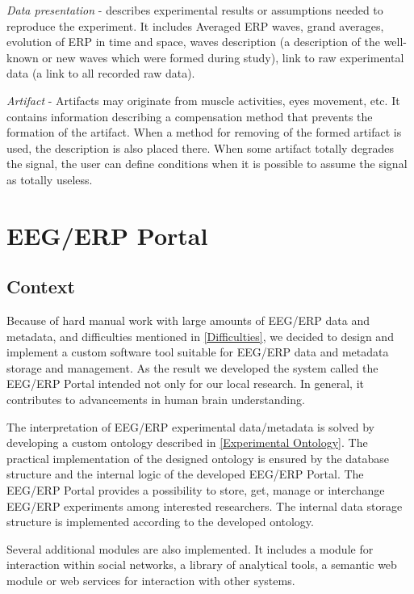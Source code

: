 \documentclass[conference]{IEEEtran}
\begin{document}
\emph{Data presentation} - describes experimental results or assumptions needed to reproduce the experiment. It includes Averaged ERP waves, grand averages, evolution of ERP in time and space, waves description (a description of the well-known or new waves which were formed during study), link to raw experimental data (a link to all recorded raw data).

\emph{Artifact} - Artifacts may originate from muscle activities, eyes movement, etc. It contains information describing a compensation method that prevents the formation of the artifact. When a method for removing of the formed artifact is used, the description is also placed there. When some artifact totally degrades the signal, the user can define conditions when it is possible to assume the signal as totally useless.

\section{\label{EEG/ERP Portal}EEG/ERP Portal}

\subsection{Context}

Because of hard manual work with large amounts of EEG/ERP data and metadata, and difficulties mentioned in \ref{Difficulties}, we decided to design and implement a custom software tool suitable for EEG/ERP data and metadata storage and management. As the result we developed the system called the EEG/ERP Portal intended not only for our local research. In general, it  contributes to advancements in human brain understanding.

The interpretation of EEG/ERP experimental data/metadata is solved by developing a custom ontology described in \ref{Experimental Ontology}. The practical implementation of the designed ontology is ensured by the database structure and the internal logic of the developed EEG/ERP Portal. The EEG/ERP Portal provides a possibility to store, get, manage or interchange
EEG/ERP experiments among interested researchers. The internal data storage structure is implemented according to the developed ontology.

Several additional modules are also implemented. It includes a module for interaction within social networks, a library of analytical tools, a semantic web module or web services for interaction with other systems.
\end{document}
